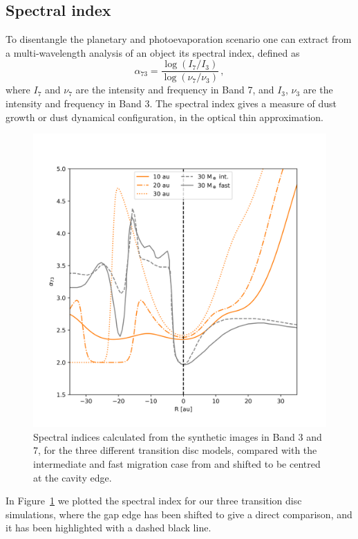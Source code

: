 \documentclass[fleqn,usenatbib]{mnras}
\begin{document}
    \subsection{Spectral index}
    To disentangle the planetary and photoevaporation scenario one can extract from a multi-wavelength analysis of an object its spectral index, defined as
    \begin{equation}
        \alpha_{73} = \frac{\log{(I_7/I_3)}}{\log{(\nu_7/\nu_3)}}\,,
    \end{equation}
    where $I_7$ and $\nu_7$ are the intensity and frequency in Band 7, and $I_3$, $\nu_3$ are the intensity and frequency in Band 3.
    The spectral index gives a measure of dust growth or dust dynamical configuration, in the optical thin approximation.
    \begin{figure}
        \centering
        \includegraphics[width=\columnwidth]{plot_comparison.png}
        \caption{Spectral indices calculated from the synthetic images in Band 3 and 7, for the three different transition disc models, compared with the intermediate and fast migration case from \citet{Nazari_2019} and shifted to be centred at the cavity edge.}
        \label{fig:spectral_index}
    \end{figure}
    In Figure~\ref{fig:spectral_index} we plotted the spectral index for our three transition disc simulations, where the gap edge has been shifted to give a direct comparison, and it has been highlighted with a dashed black line.
\end{document}
